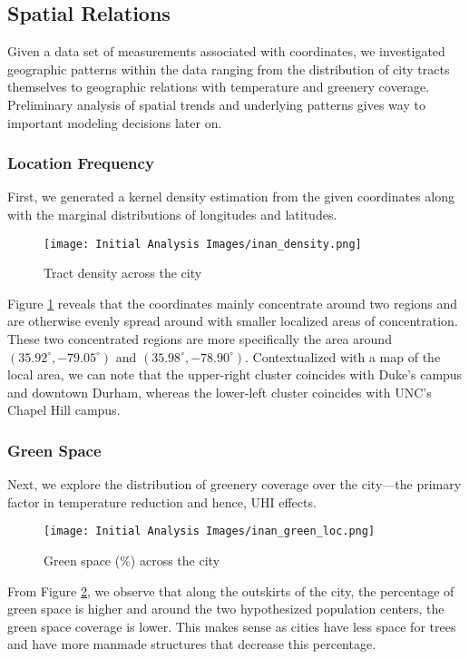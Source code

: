 \documentclass[11pt]{article}
\begin{document}
\subsection{Spatial Relations}
Given a data set of measurements associated with coordinates, we investigated geographic patterns within the data ranging from the distribution of city tracts themselves to geographic relations with temperature and greenery coverage. Preliminary analysis of spatial trends and underlying patterns gives way to important modeling decisions later on.

\subsubsection{Location Frequency}
First, we generated a kernel density estimation from the given coordinates along with the marginal distributions of longitudes and latitudes.

\begin{figure}[H]
    \centering
    \texttt{[image: Initial Analysis Images/inan\_density.png]}
    \caption{Tract density across the city}
    \label{fig:tract_density}
\end{figure}
Figure \ref{fig:tract_density} reveals that the coordinates mainly concentrate around two regions and are otherwise evenly spread around with smaller localized areas of concentration. These two concentrated regions are more specifically the area around $(35.92^{\circ}, -79.05^{\circ})$ and $(35.98^{\circ}, -78.90^{\circ})$. Contextualized with a map of the local area, we can note that the upper-right cluster coincides with Duke's campus and downtown Durham, whereas the lower-left cluster coincides with UNC's Chapel Hill campus.

\subsubsection{Green Space}
Next, we explore the distribution of greenery coverage over the city---the primary factor in temperature reduction and hence, UHI effects.
\begin{figure}[H]
    \centering
    \texttt{[image: Initial Analysis Images/inan\_green\_loc.png]}
    \caption{Green space (\%) across the city}
    \label{fig:greenspace_location}
\end{figure}
From Figure \ref{fig:greenspace_location}, we observe that along the outskirts of the city, the percentage of green space is higher and around the two hypothesized population centers, the green space coverage is lower. This makes sense as cities have less space for trees and have more manmade structures that decrease this percentage.
\end{document}
